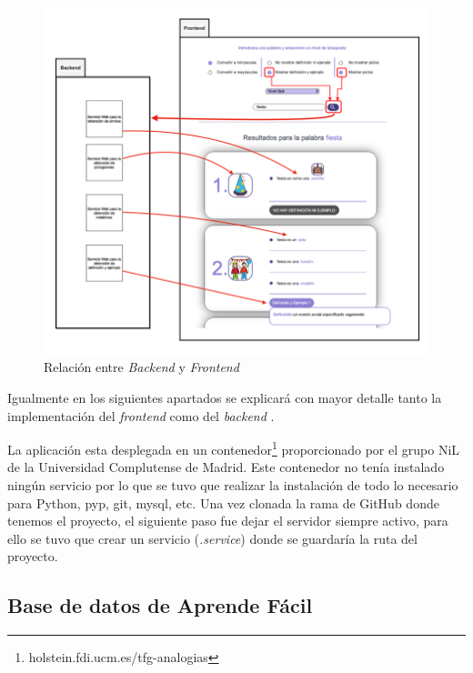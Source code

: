 \begin{figure}[!h]
	\includegraphics[width=1.2\textwidth]{Imagenes/Bitmap/Capitulo4/RelacionBackFront.png}
	\centering
	\caption{Relación entre \textit{Backend} y \textit{Frontend}}
	\label{fig:relacionBackFront}
\end{figure}


 Igualmente en los siguientes apartados se explicará con mayor detalle tanto la implementación del \textit{frontend} como del \textit{backend} . 

La aplicación esta desplegada en un contenedor\footnote{holstein.fdi.ucm.es/tfg-analogias} proporcionado por el grupo NiL de la Universidad Complutense de Madrid. Este contenedor no tenía instalado ningún servicio por lo que se tuvo que realizar la instalación de todo lo necesario para Python, pyp, git, mysql, etc. Una vez clonada la rama de GitHub donde tenemos el proyecto, el siguiente paso fue dejar el servidor siempre activo, para ello se tuvo que crear un servicio (\textit{.service}) donde se guardaría la ruta del proyecto.

\subsection{Base de datos de Aprende Fácil}
\label{cap:subsec:database}

